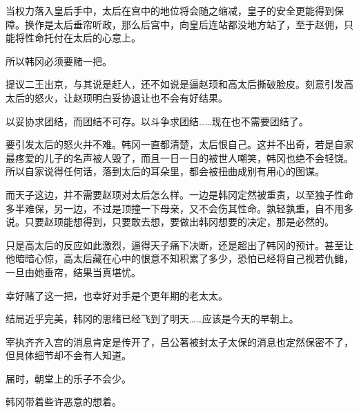 当权力落入皇后手中，太后在宫中的地位将会随之缩减，皇子的安全更能得到保障。换作是太后垂帘听政，那么后宫中，向皇后连站都没地方站了，至于赵佣，只能将性命托付在太后的心意上。

所以韩冈必须要赌一把。

提议二王出京，与其说是赶人，还不如说是逼赵顼和高太后撕破脸皮。刻意引发高太后的怒火，让赵顼明白妥协退让也不会有好结果。

以妥协求团结，而团结不可存。以斗争求团结……现在也不需要团结了。

要引发太后的怒火并不难。韩冈一直都清楚，太后恨自己。这并不出奇，若是自家最疼爱的儿子的名声被人毁了，而且一日一日的被世人嘲笑，韩冈也绝不会轻饶。所以自家说得任何话，落到太后的耳朵里，都会被扭曲成别有用心的图谋。

而天子这边，并不需要赵顼对太后怎么样。一边是韩冈定然被重责，以至独子性命多半难保，另一边，不过是顶撞一下母亲，又不会伤其性命。孰轻孰重，自不用多说。只要赵顼能想得到，只要敢去想，要做出韩冈想要的决定，那是必然的。

只是高太后的反应如此激烈，逼得天子痛下决断，还是超出了韩冈的预计。甚至让他暗暗心惊，高太后藏在心中的恨意不知积累了多少，恐怕已经将自己视若仇雠，一旦由她垂帘，结果当真堪忧。

幸好赌了这一把，也幸好对手是个更年期的老太太。

结局近乎完美，韩冈的思绪已经飞到了明天……应该是今天的早朝上。

宰执齐齐入宫的消息肯定是传开了，吕公著被封太子太保的消息也定然保密不了，但具体细节却不会有人知道。

届时，朝堂上的乐子不会少。

韩冈带着些许恶意的想着。

